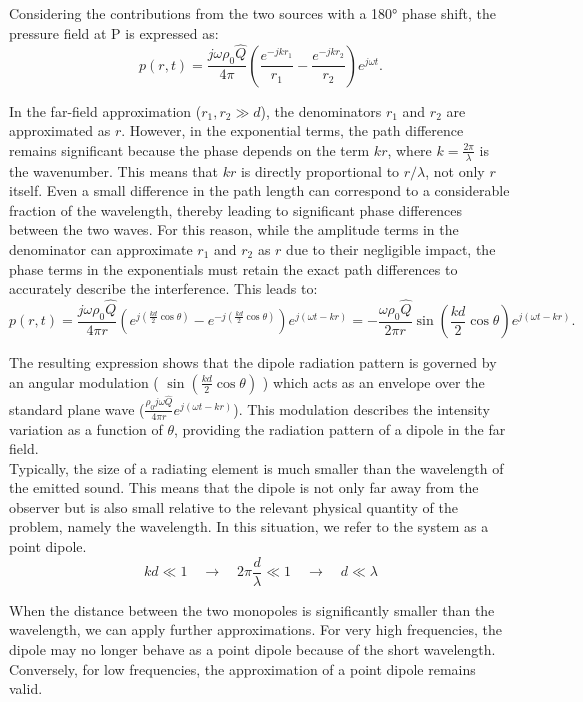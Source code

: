 \documentclass[a4paper]{article}
\begin{document}
Considering the contributions from the two sources with a 180° phase shift, the pressure field at P is expressed as:
\[
p(r, t) = \frac{j \omega \rho_0 \hat{Q}}{4 \pi} 
\left(
\frac{e^{-j k r_1}}{r_1} - \frac{e^{-j k r_2}}{r_2}
\right)
e^{j \omega t}.
\]

In the far-field approximation (\( r_1, r_2 \gg d \)), the denominators \( r_1 \) and \( r_2 \) are approximated as \( r \). However, in the exponential terms, the path difference remains significant because the phase depends on the term \( k r \), where \( k = \frac{2\pi}{\lambda} \) is the wavenumber. This means that \( k r \) is directly proportional to \( r/\lambda \), not only \( r \) itself. Even a small difference in the path length can correspond to a considerable fraction of the wavelength, thereby leading to significant phase differences between the two waves. For this reason, while the amplitude terms in the denominator can approximate \( r_1 \) and \( r_2 \) as \( r \) due to their negligible impact, the phase terms in the exponentials must retain the exact path differences to accurately describe the interference. This leads to:
\[
p(r, t) = \frac{j \omega \rho_0 \hat{Q}}{4 \pi r} 
\left(
e^{j\left(\frac{k d}{2} \cos\theta\right)} - e^{-j\left(\frac{k d}{2} \cos\theta\right)}
\right)
e^{j(\omega t - k r)} = - \frac{\omega \rho_0 \hat{Q}}{2 \pi r} 
\sin\left(\frac{k d}{2} \cos\theta\right) 
e^{j (\omega t - k r)}.
\]



The resulting expression shows that the dipole radiation pattern is governed by an angular modulation (
\(
\sin\left(\frac{k d}{2} \cos\theta\right)
\) )
which acts as an envelope over the standard plane wave (\(
\frac{\rho_0 j \omega \hat{Q}}{4 \pi r} e^{j (\omega t - k r)}
\)). This modulation describes the intensity variation as a function of \( \theta \), providing the radiation pattern of a dipole in the far field.\\




Typically, the size of a radiating element is much smaller than the wavelength of the emitted sound. This means that the dipole is not only far away from the observer but is also small relative to the relevant physical quantity of the problem, namely the wavelength. In this situation, we refer to the system as a point dipole. 
\[
kd \ll 1 \quad \to \quad 2\pi \frac{d}{\lambda} \ll 1 \quad \to \quad d \ll {\lambda}
\]

When the distance between the two monopoles is significantly smaller than the wavelength, we can apply further approximations. For very high frequencies, the dipole may no longer behave as a point dipole because of the short wavelength. Conversely, for low frequencies, the approximation of a point dipole remains valid.
\end{document}
